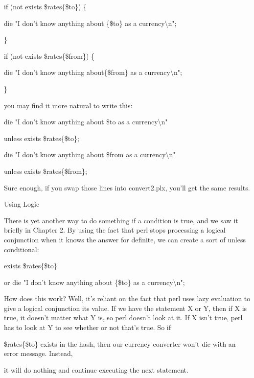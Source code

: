 \documentclass[a4paper,11pt]{book}
\begin{document}
\noindent if (not exists \$rates\{\$to\}) \{

\noindent die "I don't know anything about \{\$to\} as a currency\textbackslash n";

\noindent \}

\noindent if (not exists \$rates\{\$from\}) \{

\noindent die "I don't know anything about\{\$from\} as a currency\textbackslash n";

\noindent \}

\noindent 

\noindent you may find it more natural to write this:

\noindent 

\noindent die "I don't know anything about \$to as a currency\textbackslash n"

\noindent unless exists \$rates\{\$to\};

\noindent die "I don't know anything about \$from as a currency\textbackslash n"

\noindent unless exists \$rates\{\$from\};

\noindent 

\noindent Sure enough, if you swap those lines into convert2.plx, you'll get the same results.

\noindent 

\noindent Using Logic

\noindent There is yet another way to do something if a condition is true, and we saw it briefly in Chapter 2. By using the fact that perl stops processing a logical conjunction when it knows the answer for definite, we can create a sort of unless conditional:

\noindent 

\noindent exists \$rates\{\$to\}

\noindent or die "I don't know anything about \{\$to\} as a currency\textbackslash n";

\noindent 

\noindent How does this work? Well, it's reliant on the fact that perl uses lazy evaluation to give a logical conjunction its value. If we have the statement X or Y, then if X is true, it doesn't matter what Y is, so perl doesn't look at it. If X isn't true, perl has to look at Y to see whether or not that's true. So if

\noindent \$rates\{\$to\} exists in the hash, then our currency converter won't die with an error message. Instead,

\noindent it will do nothing and continue executing the next statement.
\end{document}
